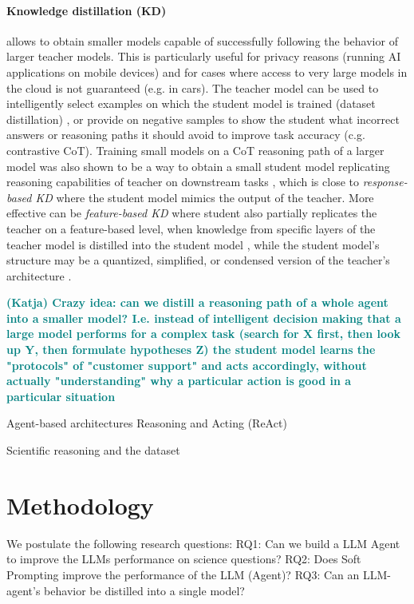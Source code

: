 \documentclass[10pt]{article}
\newcommand{\katja}[1]{\textbf{\textcolor{teal}{(Katja) #1}}}
\begin{document}
\paragraph{Knowledge distillation (KD)} allows to obtain smaller models capable of successfully following the behavior of larger teacher models. This is particularly useful for privacy reasons (running AI applications on mobile devices) and for cases where access to very large models in the cloud is not guaranteed (e.g. in cars). The teacher model can be used to intelligently select examples on which the student model is trained (dataset distillation) \cite{yu2023dataset}, or provide on negative samples to show the student what incorrect answers or reasoning paths it should avoid to improve task accuracy  \cite{li2024turning} (c.g. contrastive CoT). Training small models on a CoT reasoning path of a larger model was also shown to be a way to obtain a small student model replicating reasoning capabilities of teacher on downstream tasks \cite{magister2022teaching}, which is close to \textit{response-based KD} where the student model mimics the output of the teacher. More effective can be \textit{feature-based KD} where student also partially replicates the teacher on a feature-based level, when knowledge from specific layers of the teacher model is distilled into the student model \cite{sepahvand2022teacher}, while the student model's structure may be a quantized, simplified, or condensed version of the teacher's architecture \cite{gou2021knowledge}. 

\katja{Crazy idea: can we distill a reasoning path of a whole agent into a smaller model? I.e. instead of intelligent decision making that a large model performs for a complex task (search for X first, then look up Y, then formulate hypotheses Z) the student model learns the "protocols" of "customer support" and acts accordingly, without actually "understanding" why a particular action is good in a particular situation}

Agent-based architectures \cite{lin2024swiftsage} \cite{ghafarollahi2024sciagents}
Reasoning and Acting (ReAct) 

Scientific reasoning and the dataset \cite{lu2022learn}

\section{Methodology}
We postulate the following research questions: 
RQ1: Can we build a LLM Agent to improve the LLMs performance on science questions?
RQ2: Does Soft Prompting improve the performance of the LLM (Agent)?
RQ3: Can an LLM-agent's behavior be distilled into a single model?
\end{document}
